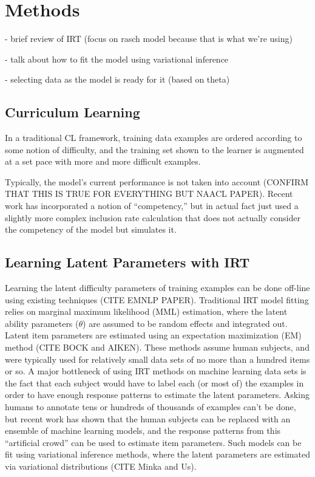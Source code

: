 \documentclass{article}
\begin{document}
\section{Methods}

- brief review of IRT (focus on rasch model because that is what we're using)

- talk about how to fit the model using variational inference

- selecting data as the model is ready for it (based on theta)
\subsection{Curriculum Learning}
In a traditional CL framework, training data examples are ordered according to some notion of difficulty, and the training set shown to the learner is augmented at a set pace with more and more difficult examples.

Typically, the model's current performance is not taken into account (CONFIRM THAT THIS IS TRUE FOR EVERYTHING BUT NAACL PAPER). Recent work has incorporated a notion of ``competency,'' but in actual fact just used a slightly more complex inclusion rate calculation that does not actually consider the competency of the model but simulates it.

\subsection{Learning Latent Parameters with IRT}
Learning the latent difficulty parameters of training examples can be done off-line using existing techniques (CITE EMNLP PAPER).
Traditional IRT model fitting relies on marginal maximum likelihood (MML) estimation, where the latent ability parameters ($\theta$) are assumed to be random effects and integrated out.
Latent item parameters are estimated using an expectation maximization (EM) method (CITE BOCK and AIKEN).
These methods assume human subjects, and were typically used for relatively small data sets of no more than a hundred items or so.
A major bottleneck of using IRT methods on machine learning data sets is the fact that each subject would have to label each (or most of) the examples in order to have enough response patterns to estimate the latent parameters.
Asking humans to annotate tens or hundreds of thousands of examples can't be done, but recent work has shown that the human subjects can be replaced with an ensemble of machine learning models, and the response patterns from this ``artificial crowd'' can be used to estimate item parameters.
Such models can be fit using variational inference methods, where the latent parameters are estimated via variational distributions (CITE Minka and Us). 
\end{document}
